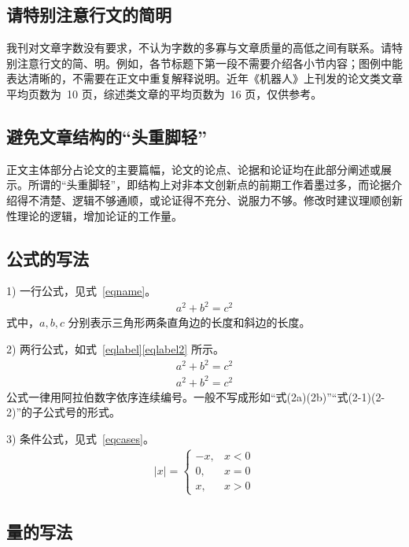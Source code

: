 \documentclass{JQRnew}
\begin{document}
\subsection{请特别注意行文的简明}

我刊对文章字数没有要求，不认为字数的多寡与文章质量的高低之间有联系。请特别注意行文的简、明。例如，各节标题下第一段不需要介绍各小节内容；图例中能表达清晰的，不需要在正文中重复解释说明。近年《机器人》上刊发的论文类文章平均页数为~10 页，综述类文章的平均页数为~16 页，仅供参考。

\subsection{避免文章结构的“头重脚轻”}

正文主体部分占论文的主要篇幅，论文的论点、论据和论证均在此部分阐述或展示。所谓的“头重脚轻”，即结构上对非本文创新点的前期工作着墨过多，而论据介绍得不清楚、逻辑不够通顺，或论证得不充分、说服力不够。修改时建议理顺创新性理论的逻辑，增加论证的工作量。

\subsection{公式的写法}

1) 一行公式，见式~\eqref{eqname}。
\begin{align}
\label{eqname}
a^2+b^2=c^2
\end{align}
式中，$a,b,c$ 分别表示三角形两条直角边的长度和斜边的长度。

2) 两行公式，如式~\eqref{eqlabel}\eqref{eqlabel2} 所示。
\begin{align}
\label{eqlabel}
a^2+b^2=c^2\\
\label{eqlabel2}
a^2+b^2=c^2
\end{align}
公式一律用阿拉伯数字依序连续编号。一般不写成形如“式(2a)(2b)”“式(2-1)(2-2)”的子公式号的形式。

3) 条件公式，见式~\eqref{eqcases}。
\begin{align}
\label{eqcases}
|x| =
\begin{cases}
-x, & x < 0\\
0,  &  x = 0\\
x,  &  x > 0
\end{cases}
\end{align}

\subsection{量的写法}
\end{document}
